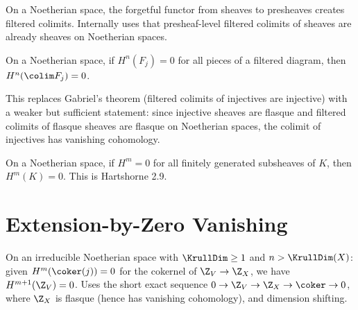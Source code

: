 \begin{theorem}\label{thm:createsFilteredColimit}
  \leanok
  On a Noetherian space, the forgetful functor from sheaves to presheaves
  creates filtered colimits. Internally uses that presheaf-level filtered
  colimits of sheaves are already sheaves on Noetherian spaces.
\end{theorem}

\begin{theorem}\label{thm:sheafH_preserves_filtered_colimits}
  \leanok
  On a Noetherian space, if $H^n(F_j) = 0$ for all pieces of a filtered
  diagram, then $H^n(\colim F_j) = 0$.

  This replaces Gabriel's theorem (filtered colimits of injectives are injective)
  with a weaker but sufficient statement: since injective sheaves are flasque
  and filtered colimits of flasque sheaves are flasque on Noetherian spaces,
  the colimit of injectives has vanishing cohomology.
\end{theorem}

\begin{theorem}\label{thm:cohomology_vanishing_fg}
  \leanok
  On a Noetherian space, if $H^m = 0$ for all finitely generated subsheaves
  of $K$, then $H^m(K) = 0$. This is Hartshorne 2.9.
\end{theorem}


\chapter{Extension-by-Zero Vanishing}\label{ch:zeroOutsideVanishing}

\begin{theorem}\label{thm:zeroOutsideInt_vanishing}
  \leanok
  On an irreducible Noetherian space with $\KrullDim \ge 1$ and $n > \KrullDim(X)$:
  given $H^m(\coker(j)) = 0$ for the cokernel of $\Z_V \to \Z_X$,
  we have $H^{m+1}(\Z_V) = 0$. Uses the short exact sequence
  $0 \to \Z_V \to \Z_X \to \coker \to 0$, where $\Z_X$ is flasque (hence has
  vanishing cohomology), and dimension shifting.
\end{theorem}

